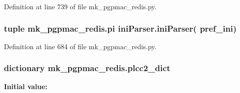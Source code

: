 Definition at line 739 of file mk\-\_\-pgpmac\-\_\-redis.\-py.

\hypertarget{namespacemk__pgpmac__redis_a2f5bbda0250eecd94d166dc0a2fbff86}{
\subsubsection[{pi}]{\setlength{\rightskip}{0pt plus 5cm}tuple mk\-\_\-pgpmac\-\_\-redis.\-pi {\bf ini\-Parser.\-ini\-Parser}( {\bf pref\-\_\-ini})}}\label{namespacemk__pgpmac__redis_a2f5bbda0250eecd94d166dc0a2fbff86}


Definition at line 684 of file mk\-\_\-pgpmac\-\_\-redis.\-py.

\hypertarget{namespacemk__pgpmac__redis_a70d6a840305f17ce4f2936166fa2750e}{
\subsubsection[{plcc2\-\_\-dict}]{\setlength{\rightskip}{0pt plus 5cm}dictionary mk\-\_\-pgpmac\-\_\-redis.\-plcc2\-\_\-dict}}\label{namespacemk__pgpmac__redis_a70d6a840305f17ce4f2936166fa2750e}
{\bfseries Initial value\-:}
